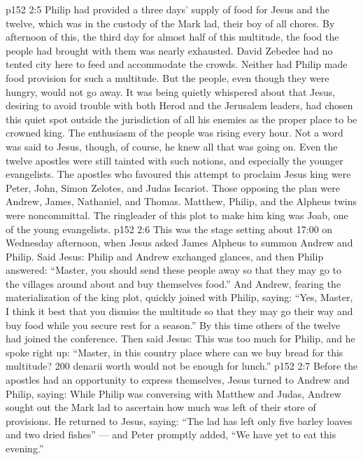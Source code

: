 \vs p152 2:5 \pc Philip had provided a three days’ supply of food for Jesus and the twelve, which was in the custody of the Mark lad, their boy of all chores. By afternoon of this, the third day for almost half of this multitude, the food the people had brought with them was nearly exhausted. David Zebedee had no tented city here to feed and accommodate the crowds. Neither had Philip made food provision for such a multitude. But the people, even though they were hungry, would not go away. It was being quietly whispered about that Jesus, desiring to avoid trouble with both Herod and the Jerusalem leaders, had chosen this quiet spot outside the jurisdiction of all his enemies as the proper place to be crowned king. The enthusiasm of the people was rising every hour. Not a word was said to Jesus, though, of course, he knew all that was going on. Even the twelve apostles were still tainted with such notions, and especially the younger evangelists. The apostles who favoured this attempt to proclaim Jesus king were Peter, John, Simon Zelotes, and Judas Iscariot. Those opposing the plan were Andrew, James, Nathaniel, and Thomas. Matthew, Philip, and the Alpheus twins were noncommittal. The ringleader of this plot to make him king was Joab, one of the young evangelists.
\vs p152 2:6 \pc This was the stage setting about 17:00 on Wednesday afternoon, when Jesus asked James Alpheus to summon Andrew and Philip. Said Jesus:  Philip and Andrew exchanged glances, and then Philip answered: “Master, you should send these people away so that they may go to the villages around about and buy themselves food.” And Andrew, fearing the materialization of the king plot, quickly joined with Philip, saying: “Yes, Master, I think it best that you dismiss the multitude so that they may go their way and buy food while you secure rest for a season.” By this time others of the twelve had joined the conference. Then said Jesus:  This was too much for Philip, and he spoke right up: “Master, in this country place where can we buy bread for this multitude? 200 denarii worth would not be enough for lunch.”
\vs p152 2:7 Before the apostles had an opportunity to express themselves, Jesus turned to Andrew and Philip, saying:  While Philip was conversing with Matthew and Judas, Andrew sought out the Mark lad to ascertain how much was left of their store of provisions. He returned to Jesus, saying: “The lad has left only five barley loaves and two dried fishes” --- and Peter promptly added, “We have yet to eat this evening.”
